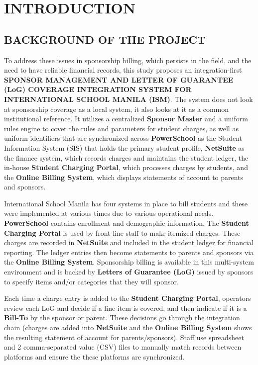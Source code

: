 
\section{INTRODUCTION}

\subsection{BACKGROUND OF THE PROJECT}

    To address these issues in sponsorship billing, which persists in the field, and the need to have reliable financial records, this study proposes an integration-first \textbf{SPONSOR MANAGEMENT AND LETTER OF GUARANTEE (LoG) COVERAGE INTEGRATION SYSTEM FOR INTERNATIONAL SCHOOL MANILA (ISM)}. The system does not look at sponsorship coverage as a local system, it also looks at it as a common institutional reference. It utilizes a centralized \textbf{Sponsor Master} and a uniform rules engine to cover the rules and parameters for student charges, as well as uniform identifiers that are synchronized across \textbf{PowerSchool} as the Student Information System (SIS) that holds the primary student profile, \textbf{NetSuite} as the finance system, which records charges and maintains the student ledger, the in-house \textbf{Student Charging Portal}, which processes charges by students, and the \textbf{Online Billing System}, which displays statements of account to parents and sponsors.
    
    International School Manila has four systems in place to bill students and these were implemented at various times due to various operational needs. \textbf{PowerSchool} contains enrollment and demographic information. The \textbf{Student Charging Portal} is used by front-line staff to make itemized charges. These charges are recorded in \textbf{NetSuite} and included in the student ledger for financial reporting. The ledger entries then become statements to parents and sponsors via the \textbf{Online Billing System}. Sponsorship billing is available in this multi-system environment and is backed by \textbf{Letters of Guarantee (LoG)} issued by sponsors to specify items and/or categories that they will sponsor.
    
    Each time a charge entry is added to the \textbf{Student Charging Portal}, operators review each LoG and decide if a line item is covered, and then indicate if it is a \textbf{Bill-To} by the sponsor or parent. These decisions go through the integration chain (charges are added into \textbf{NetSuite} and the \textbf{Online Billing System} shows the resulting statement of account for parents/sponsors). Staff use spreadsheet and 2 comma-separated value (CSV) files to manually match records between platforms and ensure the these platforms are synchronized.
 
